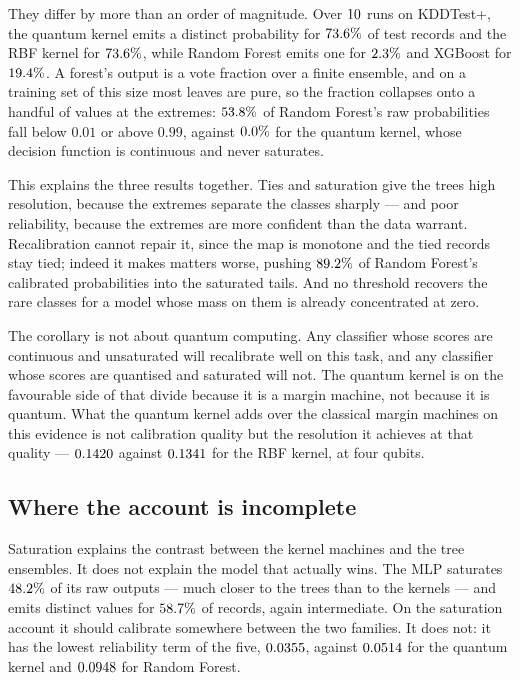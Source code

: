 \documentclass[journal]{IEEEtran}
\begin{document}
They differ by more than an order of magnitude. Over $10$ runs on
KDDTest+, the quantum kernel emits a distinct probability for
$73.6\%$ of test records and the RBF kernel for
$73.6\%$, while Random Forest emits one for $2.3\%$
and XGBoost for $19.4\%$. A forest's output is a vote fraction
over a finite ensemble, and on a training set of this size most leaves are
pure, so the fraction collapses onto a handful of values at the extremes:
$53.8\%$ of Random Forest's raw probabilities fall below $0.01$ or
above $0.99$, against $0.0\%$ for the quantum kernel, whose
decision function is continuous and never saturates.

This explains the three results together. Ties and saturation give the trees
high resolution, because the extremes separate the classes sharply --- and
poor reliability, because the extremes are more confident than the data
warrant. Recalibration cannot repair it, since the map is monotone and the
tied records stay tied; indeed it makes matters worse, pushing
$89.2\%$ of Random Forest's calibrated probabilities into the
saturated tails. And no threshold recovers the rare classes for a model
whose mass on them is already concentrated at zero.

The corollary is not about quantum computing. Any classifier whose scores
are continuous and unsaturated will recalibrate well on this task, and any
classifier whose scores are quantised and saturated will not. The quantum
kernel is on the favourable side of that divide because it is a margin
machine, not because it is quantum. What the quantum kernel adds over the
classical margin machines on this evidence is not calibration quality but
the resolution it achieves at that quality --- $0.1420$ against
$0.1341$ for the RBF kernel, at four qubits.

\subsection{Where the account is incomplete}
Saturation explains the contrast between the kernel machines and the tree
ensembles. It does not explain the model that actually wins. The MLP
saturates $48.2\%$ of its raw outputs --- much closer to the trees
than to the kernels --- and emits distinct values for $58.7\%$
of records, again intermediate. On the saturation account it should
calibrate somewhere between the two families. It does not: it has the
lowest reliability term of the five, $0.0355$, against $0.0514$ for
the quantum kernel and $0.0948$ for Random Forest.
\end{document}
